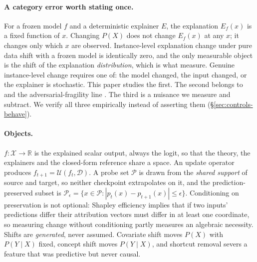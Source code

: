 \documentclass{article}
\begin{document}
\paragraph{A category error worth stating once.} For a frozen model $f$ and a deterministic explainer
$E$, the explanation $E_f(x)$ is a fixed function of $x$. Changing $P(X)$ does not change $E_f(x)$ at
any $x$; it changes only which $x$ are observed. Instance-level explanation change under pure data
shift with a frozen model is identically zero, and the only measurable object is the shift of the
explanation \emph{distribution}, which is what \citet{mougan2025} measure. Genuine instance-level
change requires one of: the model changed, the input changed, or the explainer is stochastic. This
paper studies the first. The second belongs to \citet{fass2026} and the adversarial-fragility line
\citep{ghorbani2019,dombrowski2019,slack2020}. The third is a nuisance we measure and subtract. We verify all
three empirically instead of asserting them (\S\ref{sec:controls-behave}).

\paragraph{Objects.} $f:\mathcal{X}\to\mathbb{R}$ is the explained scalar output, always the logit,
so that the theory, the explainers and the closed-form reference share a space. An update operator
produces $f_{t+1}=\mathcal{U}(f_t,\mathcal{D})$. A probe set $\mathcal{P}$ is drawn from the
\emph{shared support} of source and target, so neither checkpoint extrapolates on it, and the
prediction-preserved subset is
$\mathcal{P}_\epsilon=\{x\in\mathcal{P}:|p_t(x)-p_{t+1}(x)|\le\epsilon\}$. Conditioning on
preservation is not optional: Shapley efficiency implies that if two inputs' predictions differ their
attribution vectors must differ in at least one coordinate, so measuring change without conditioning
partly measures an algebraic necessity. Shifts are \emph{generated}, never assumed. Covariate shift
moves $P(X)$ with $P(Y\mid X)$ fixed, concept shift moves $P(Y\mid X)$, and shortcut removal severs a
feature that was predictive but never causal.
\end{document}
